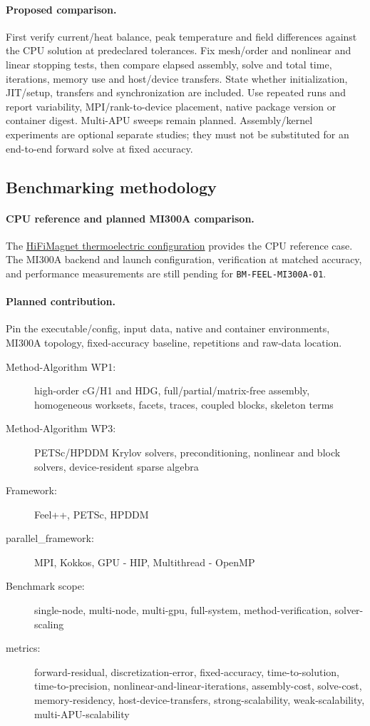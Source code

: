 \paragraph{Proposed comparison.}
First verify current/heat balance, peak temperature and field differences
against the CPU solution at predeclared tolerances. Fix mesh/order and nonlinear
and linear stopping tests, then compare elapsed assembly, solve and total time,
iterations, memory use and host/device transfers. State whether initialization,
JIT/setup, transfers and synchronization are included. Use repeated runs and
report variability, MPI/rank-to-device placement, native package version or
container digest. Multi-APU sweeps remain planned. Assembly/kernel experiments
are optional separate studies; they must not be substituted for an end-to-end
forward solve at fixed accuracy.

\subsection{Benchmarking methodology}


\paragraph{CPU reference and planned MI300A comparison.}
The \href{https://github.com/numpex/apps-feelpp/tree/main/src/app-feelpp-toolbox/thermoelectric/hifimagnet}{HiFiMagnet thermoelectric configuration}
provides the CPU reference case. The MI300A backend and launch configuration,
verification at matched accuracy, and performance measurements are still
pending for \texttt{BM-FEEL-MI300A-01}.
\paragraph{Planned contribution.} Pin the executable/config, input data, native and container environments,
MI300A topology, fixed-accuracy baseline, repetitions and raw-data location.
\begin{description}
  \item[Method-Algorithm WP1:] high-order cG/H1 and HDG, full/partial/matrix-free assembly, homogeneous worksets, facets, traces, coupled blocks, skeleton terms
  \item[Method-Algorithm WP3:] PETSc/HPDDM Krylov solvers, preconditioning, nonlinear and block solvers, device-resident sparse algebra
  \item[Framework:] Feel++, PETSc, HPDDM
  \item[parallel\_framework:] MPI, Kokkos, GPU - HIP, Multithread - OpenMP
  \item[Benchmark scope:] single-node, multi-node, multi-gpu, full-system, method-verification, solver-scaling
  \item[metrics:] forward-residual, discretization-error, fixed-accuracy, time-to-solution, time-to-precision, nonlinear-and-linear-iterations, assembly-cost, solve-cost, memory-residency, host-device-transfers, strong-scalability, weak-scalability, multi-APU-scalability
\end{description}
